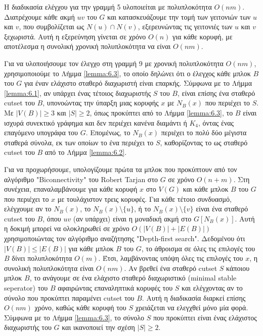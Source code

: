 Η διαδικασία ελέγχου για την γραμμή 5 υλοποιείται με πολυπλοκότητα $O(nm)$. Διατρέχουμε κάθε ακμή $uv$ του $G$ και κατασκευάζουμε την τομή των γειτονιών των $u$ και $v$, που συμβολίζεται ως $N(u) \cap N(v)$, εξερευνώντας τις γειτονιές των $u$ και $v$ ξεχωριστά. Αυτή η εξερεύνηση γίνεται σε χρόνο $O(n)$ για κάθε κορυφή, με αποτέλεσμα η συνολική χρονική πολυπλοκότητα να είναι $O(nm)$.

Για να υλοποιήσουμε τον έλεγχο στη γραμμή 9 με χρονική πολυπλοκότητα $O(nm)$, χρησιμοποιούμε το Λήμμα \ref{lemma:6.3}, το οποίο δηλώνει ότι ο έλεγχος κάθε μπλοκ $B$ του $G$ για έναν ελάχιστο σταθερό διαχωριστή είναι επαρκής. Σύμφωνα με το Λήμμα \ref{lemma:6.1}, αν υπάρχει ένας τέτοιος διαχωριστής $S$ του $B$, είναι επίσης ένα σταθερό cutset του $B$, υπονοώντας την ύπαρξη μιας κορυφής $x$ με $N_B(x)$ που περιέχει το $S$. Με $|V(B)| \geq 3$ και $|S| \geq 2$, όπως προκύπτει από το Λήμμα \ref{lemma:6.3}, το $B$ είναι ισχυρά συνεκτικό γράφημα και δεν περιέχει κανένα διαμάντι ή $K_4$, όντας ένας επαγόμενο υπογράφα του $G$. Επομένως, το $N_B(x)$ περιέχει το πολύ δύο μέγιστα σταθερά σύνολα, εκ των οποίων το ένα περιέχει το $S$, καθορίζοντας το ως σταθερό cutset του $B$ από το Λήμμα \ref{lemma:6.2}.

Για να προχωρήσουμε, υπολογίζουμε πρώτα τα μπλοκ που προκύπτουν από τον αλγόριθμο "Biconnectivity" του Robert Tarjan \cite{tarjan-depth-first-search} στο $G$ σε χρόνο $O(n + m)$. Στη συνέχεια, επαναλαμβάνουμε για κάθε κορυφή $x$ στο $V(G)$ και κάθε μπλοκ $B$ του $G$ που περιέχει το $x$ με τουλάχιστον τρεις κορυφές. Για κάθε τέτοιο συνδυασμό, ελέγχουμε αν το $N_B(x)$, το $N_B(x) \setminus \{u\}$, ή το $N_B(x) \setminus \{v\}$ είναι ένα σταθερό cutset του $B$, όπου $uv$ (αν υπάρχει) είναι η μοναδική ακμή στο $G[N_B(x)]$. Αυτή η δοκιμή μπορεί να ολοκληρωθεί σε χρόνο $O(|V(B)| + |E(B)|)$ χρησιμοποιώντας τον αλγόριθμο αναζήτησης "Depth-first search". Δεδομένου ότι $|V(B)| \leq |E(B)|$ για κάθε μπλοκ $B$ του $G$, το άθροισμα σε όλες τις επιλογές του $B$ δίνει πολυπλοκότητα $O(m)$. Έτσι, λαμβάνοντας υπόψη όλες τις επιλογές του $x$, η συνολική πολυπλοκότητα είναι $O(nm)$. Αν βρεθεί ένα σταθερό cutset $S$ κάποιου μπλοκ $B$, το ανάγουμε σε ένα ελάχιστο σταθερό διαχωριστικό (minimal stable seperator) του $B$ αφαιρώντας επαναληπτικά κορυφές του $S$ και ελέγχοντας αν το σύνολο που προκύπτει παραμένει cutset του $B$. Αυτή η διαδικασία διαρκεί επίσης $O(nm)$ χρόνο, καθώς κάθε κορυφή του $S$ χρειάζεται να ελεγχθεί μόνο μία φορά. Σύμφωνα με το Λήμμα \ref{lemma:6.3}, το σύνολο $S$ που προκύπτει είναι ένας ελάχιστος διαχωριστής του $G$ και ικανοποιεί την σχέση $|S| \geq 2$.

